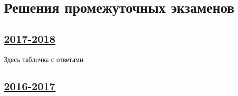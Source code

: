 \thispagestyle{empty}
\section{Решения промежуточных экзаменов}


\subsection[2017-2018]{\hyperref[sec:midterm_exam_2017_2018]{2017-2018}}
\label{sec:sol_midterm_exam_2017_2018}

Здесь табличка с ответами


\subsection[2016-2017]{\hyperref[sec:midterm_exam_2016_2017]{2016-2017}}
\label{sec:sol_midterm_exam_2016_2017}
